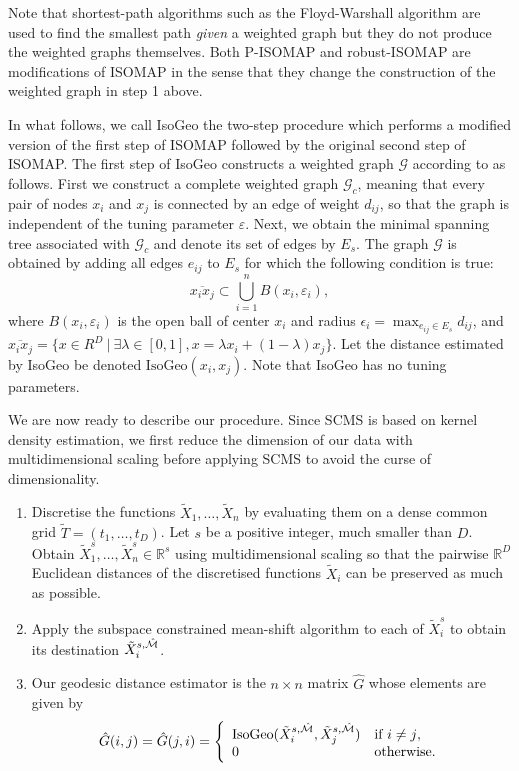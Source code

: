 Note that shortest-path algorithms such as the Floyd-Warshall algorithm
are used to find the smallest path \textit{given} a weighted graph but
they do not produce the weighted graphs themselves. Both P-ISOMAP and
robust-ISOMAP are modifications of ISOMAP in the sense that they change
the construction of the weighted graph in step 1 above.

In what follows, we call IsoGeo the two-step procedure which performs a
modified version of the first step of ISOMAP followed by the original
second step of ISOMAP. The first step of IsoGeo constructs a weighted
graph \(\mathcal{G}\) according to \cite{Dimeglio2014} as follows. First
we construct a complete weighted graph \(\mathcal{G}_c\), meaning that
every pair of nodes \(x_i\) and \(x_j\) is connected by an edge of
weight \(d_{ij}\), so that the graph is independent of the tuning
parameter \(\varepsilon\). Next, we obtain the minimal spanning tree
associated with \(\mathcal{G}_c\) and denote its set of edges by
\(E_s\). The graph \(\mathcal{G}\) is obtained by adding all edges
\(e_{ij}\) to \(E_s\) for which the following condition is true:
\[ \overline{x_ix_j} \subset \bigcup_{i=1}^n B(x_i,\varepsilon_i),\]
where \(B(x_i,\varepsilon_i)\) is the open ball of center \(x_i\) and
radius \(\epsilon_i = \max_{e_{ij}\in E_s}d_{ij}\), and
\(\overline{x_ix_j}= \{x\in R^D \ | \ \exists \lambda \in [0,1], x=\lambda x_i + (1-\lambda)x_j \}\).
Let the distance estimated by IsoGeo be denoted
\(\text{IsoGeo}(x_i,x_j)\). Note that IsoGeo has no tuning parameters.

We are now ready to describe our procedure. Since SCMS is based on
kernel density estimation, we first reduce the dimension of our data
with multidimensional scaling before applying SCMS to avoid the curse of
dimensionality.

\begin{enumerate}
\def\labelenumi{\arabic{enumi}.}
\tightlist
\item
  Discretise the functions \(\tilde X_1,\ldots,\tilde X_n\) by
  evaluating them on a dense common grid
  \(\tilde T=(t_{1},\ldots,t_{D})\). Let \(s\) be a positive integer,
  much smaller than \(D\). Obtain
  \(\tilde X^s_1,\ldots,\tilde X^s_n \in \mathbb R^s\) using
  multidimensional scaling so that the pairwise \(\mathbb R^D\)
  Euclidean distances of the discretised functions \(\tilde X_i\) can be
  preserved as much as possible.
\item
  Apply the subspace constrained mean-shift algorithm \cite{Ozertem2011}
  to each of \(\tilde X^s_i\) to obtain its destination
  \(\tilde X^{s,\hat {\mathcal{M}}}_i\).
\item
  Our geodesic distance estimator is the \(n{\times}n\) matrix
  \(\hat G\) whose elements are given by \[
  \hat G(i,j)=\hat G(j,i) = \left\{ \begin{array}{ll}
   \text{IsoGeo}(\tilde X^{s,\hat {\mathcal{M}}}_i,\tilde X^{s,\hat {\mathcal{M}}}_j) & \textrm{if $i\neq j$,}\\
   0 & \textrm{otherwise.}
    \end{array} \right.
  \]
\end{enumerate}

